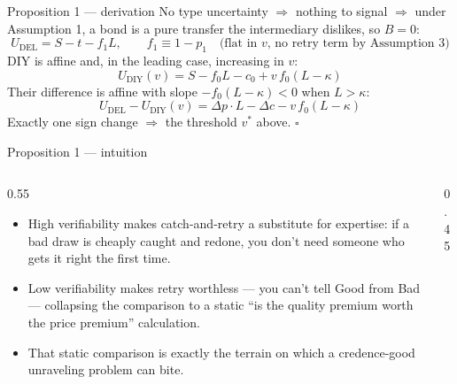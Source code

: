 \documentclass[11pt,aspectratio=169]{beamer}
\newcommand{\UDIY}{U_{\mathrm{DIY}}}
\newcommand{\UDEL}{U_{\mathrm{DEL}}}
\begin{document}
\begin{frame}{Proposition 1 --- derivation}
No type uncertainty $\Rightarrow$ nothing to signal $\Rightarrow$ under Assumption 1, a bond is a pure transfer the intermediary dislikes, so $B=0$:
\begin{equation*}
  \UDEL = S-t-f_1L, \qquad f_1\equiv1-p_1 \quad\text{(flat in $v$, no retry term by Assumption 3)}
\end{equation*}
\pause
DIY is affine and, in the leading case, increasing in $v$:
\begin{equation*}
  \UDIY(v) = S-f_0L-c_0+v\,f_0(L-\kappa)
\end{equation*}
\pause
Their difference is affine with slope $-f_0(L-\kappa)<0$ when $L>\kappa$:
\begin{equation*}
  \UDEL-\UDIY(v) = \Delta p\cdot L-\Delta c-v\,f_0(L-\kappa)
\end{equation*}
\pause
Exactly one sign change $\Rightarrow$ the threshold $v^*$ above. $\square$
\end{frame}

\begin{frame}{Proposition 1 --- intuition}
\begin{columns}
\begin{column}{0.55\textwidth}
\begin{itemize}
  \item High verifiability makes catch-and-retry a \alert{substitute} for expertise: if a bad draw is cheaply caught and redone, you don't need someone who gets it right the first time.
  \item Low verifiability makes retry worthless --- you can't tell Good from Bad --- collapsing the comparison to a static ``is the quality premium worth the price premium'' calculation.
  \item That static comparison is exactly the terrain on which a credence-good unraveling problem can bite.
\end{itemize}
\end{column}
\begin{column}{0.45\textwidth}
\centering
{}
\end{column}
\end{columns}
\end{frame}
\end{document}
